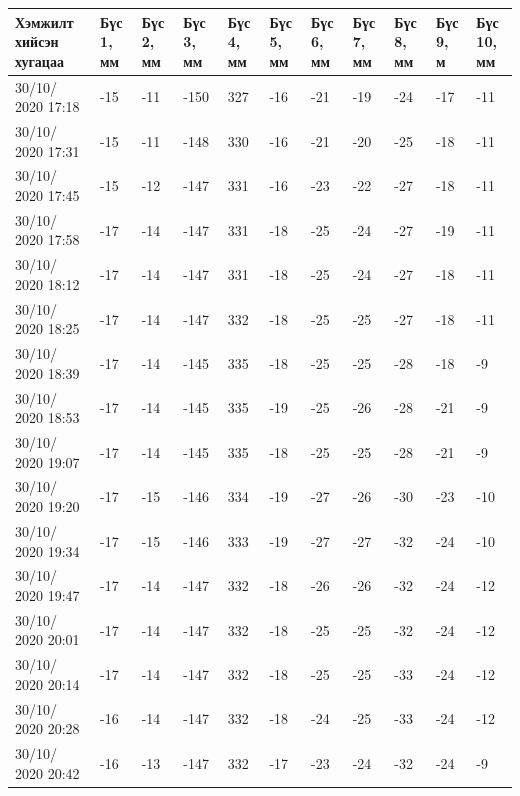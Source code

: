\begin{table}[h]
    \centering
    \begin{tabular}{|p{1.5cm}|p{0.8cm}|p{0.8cm}|p{0.8cm}|p{0.8cm}|p{0.8cm}|p{0.8cm}|p{0.8cm}|p{0.8cm}|p{0.8cm}|p{0.8cm}|}
         \hline
     Хэмжилт хийсэн хугацаа & Бүс 1, мм&	Бүс 2, мм&	Бүс 3, мм&	Бүс 4, мм&	Бүс 5, мм&	Бүс 6, мм&	Бүс 7, мм&	Бүс 8, мм&	Бүс 9, м&	Бүс 10, мм\\ \hline
30/10/ 2020 17:18&	-15&-11&-150&	327&	-16&-21&-19&-24&-17&	-11\\ \hline
30/10/ 2020 17:31&	-15&-11&-148&	330&	-16&-21&-20&-25&-18&	-11\\ \hline
30/10/ 2020 17:45&	-15&-12&-147&	331&	-16&-23&-22&-27&-18&	-11\\ \hline
30/10/ 2020 17:58&	-17&-14&-147&	331&	-18&-25&-24&-27&-19&	-11\\ \hline
30/10/ 2020 18:12&	-17&-14&-147&	331&	-18&-25&-24&-27&-18&	-11\\ \hline
30/10/ 2020 18:25&	-17&-14&-147&	332&	-18&-25&-25&-27&-18&	-11\\ \hline
30/10/ 2020 18:39&	-17&-14&-145&	335&	-18&-25&-25&-28&-18&	-9\\ \hline
30/10/ 2020 18:53&	-17&-14&-145&	335&	-19&-25&-26&-28&-21&	-9\\ \hline
30/10/ 2020 19:07&	-17&-14&-145&	335&	-18&-25&-25&-28&-21&	-9\\ \hline
30/10/ 2020 19:20&	-17&-15&-146&	334&	-19&-27&-26&-30&-23&	-10\\ \hline
30/10/ 2020 19:34&	-17&-15&-146&	333&	-19&-27&-27&-32&-24&	-10\\ \hline
30/10/ 2020 19:47&	-17&-14&-147&	332&	-18&-26&-26&-32&-24&	-12\\ \hline
30/10/ 2020 20:01&	-17&-14&-147&	332&	-18&-25&-25&-32&-24&	-12\\ \hline
30/10/ 2020 20:14&	-17&-14&-147&	332&	-18&-25&-25&-33&-24&	-12\\ \hline
30/10/ 2020 20:28&	-16&-14&-147&	332&	-18&-24&-25&-33&-24&	-12\\ \hline
30/10/ 2020 20:42&	-16&-13&-147&	332&	-17&-23&-24&-32&-24&	-9\\ \hline
    \end{tabular}
\end{table}
